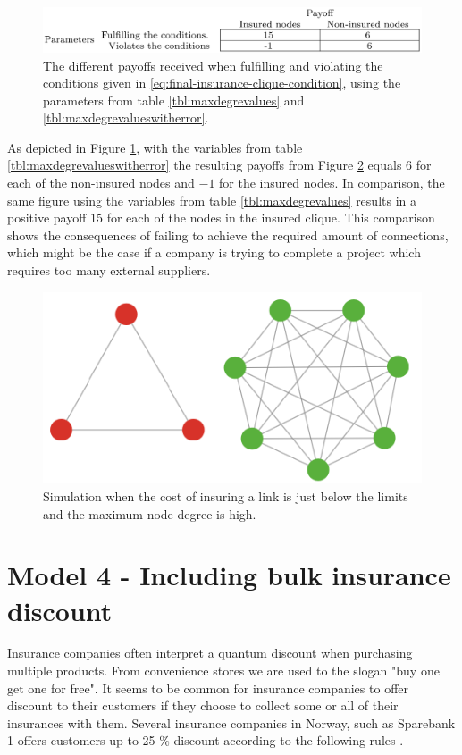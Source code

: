 \begin{figure}[h]
\centering
  \includegraphics[width=1.0\linewidth]{../Figures/payoffWhenFulfillingAndViolatingConditionsInMaxDegreeSimulation.png}
  \caption{\label{fig:payoffMaxDegreeSimulation} The different payoffs received when fulfilling and violating the conditions given in \ref{eq:final-insurance-clique-condition}, using the parameters from table \ref{tbl:maxdegrevalues} and \ref{tbl:maxdegrevalueswitherror}. }
\end{figure}

As depicted in Figure \ref{fig:payoffMaxDegreeSimulation}, with the variables from table \ref{tbl:maxdegrevalueswitherror} the resulting payoffs from Figure \ref{fig:bonusviolatingWithErrors} equals $6$ for each of the non-insured nodes and $-1$ for the insured nodes. In comparison, the same figure using the variables from table \ref{tbl:maxdegrevalues} results in a positive payoff $15$ for each of the nodes in the insured clique. This comparison shows the consequences of failing to achieve the required amount of connections, which might be the case if a company is trying to complete a project which requires too many external suppliers. 

\begin{figure}[h]
\centering
  \includegraphics[width=0.6\linewidth]{../Figures/BonusGameInsuredCliqueWithErrors.png}
  \caption{\label{fig:bonusviolatingWithErrors} Simulation when the cost of insuring a link is just below the limits and the maximum node degree is high. }
\end{figure}

\section{Model 4 - Including bulk insurance discount}

Insurance companies often interpret a quantum discount when purchasing multiple products. From convenience stores we are used to the slogan "buy one get one for free". It seems to be common for insurance companies to offer discount to their customers if they choose to collect some or all of their insurances with them. Several insurance companies in Norway, such as Sparebank 1 offers customers up to 25 $\%$ discount according to the following rules \cite{sparebank1}. 

